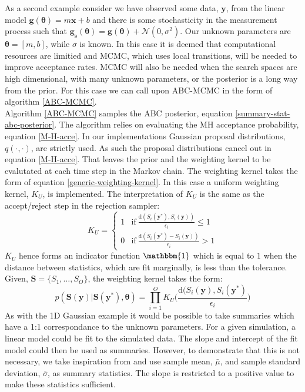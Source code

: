 As a second example consider we have observed some data, $\bm{y}$, from the linear model $\bm{g}(\bm{\theta}) = m\bm{x} + b$ and there is some stochasticity in the measurement process such that $\bm{g_s}(\bm{\theta}) = \bm{g}(\bm{\theta}) + \mathcal{N}(0,\sigma^2)$. Our unknown parameters are $\bm{\theta} = [m,b]$, while $\sigma$ is known. In this case it is deemed that computational resources are limitied and MCMC, which uses local transitions, will be needed to improve acceptance rates. MCMC will also be needed when the search spaces are high dimensional, with many unknown parameters, or the posterior is a long way from the prior. For this case we can call upon ABC-MCMC in the form of algorithm \ref{ABC-MCMC}. \\

Algorithm \ref{ABC-MCMC} samples the ABC posterior, equation \ref{summary-stat-abc-posterior}. The algorithm relies on evaluating the MH acceptance probability, equation \ref{M-H-acce}. In our implementations Gaussian proposal distributions, $q(\cdot,\cdot)$, are strictly used. As such the proposal distributions cancel out in equation \ref{M-H-acce}. That leaves the prior and the weighting kernel to be evalutated at each time step in the Markov chain. The weighting kernel takes the form of equation \ref{generic-weighting-kernel}. In this case a uniform weighting kernel, $K_U$, is implemented. The interpretation of $K_U$ is the same as the accept/reject step in the rejection sampler: 
\begin{equation}
	K_U = 
	\begin{cases}
		1 & \text{if}\ 	\frac{\text{d}(S_i(\bm{y^*}),S_i(\bm{y}))}				{\epsilon_i} \leq 1\\
		0 & \text{if}\ \frac{\text{d}(S_i(\bm{y^*}) - S_i(\bm{y}))}				{\epsilon_i} > 1
	\end{cases}
\end{equation}
$K_U$ hence forms an indicator function $\mathbbm{1}$ which is equal to $1$ when the distance between statistics, which are fit marginally, is less than the tolerance. Given, $\bm{S} = \{S_1,\dots,S_O\}$, the weighting kernel takes the form:
\begin{equation}
	p(\bm{S}(\bm{y})|\bm{S}(\bm{y^*}),\bm{\theta}) = \prod_{i = 1}^{O} K_U\Big(\frac{\text{d}(S_i(\bm{y}),S_i(\bm{y^*})}{\epsilon_i}\Big)
	\label{weight-kernel}
\end{equation}
\noindent
As with the 1D Gaussian example it would be possible to take summaries which have a 1:1 correspondance to the unknown parameters. For a given simulation, a linear model could be fit to the simulated data. The slope and intercept of the fit model could then be used as summaries. However, to demonstrate that this is not necessary, we take inspiration from \citet{vrugt2013toward} and use sample mean, $\bar{\mu}$, and sample standard deviation, $\bar{\sigma}$, as summary statistics. The slope is restricted to a positive value to make these statistics sufficient. \\

